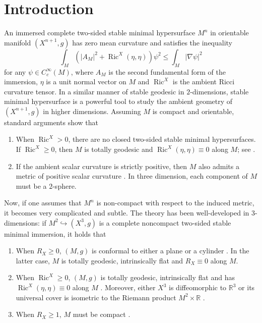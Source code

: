 \documentclass[11pt,letterpaper]{amsart}
\DeclareMathOperator{\Ric}{Ric}
\newcommand{\bR}{\mathbb{R}}
\theoremstyle{definition}
\theoremstyle{remark}
\numberwithin{equation}{section}
\begin{document}
\section{Introduction}
An immersed complete two-sided  stable minimal hypersurface $M^n$ in orientable manifold $(X^{n+1},g)$ has zero mean curvature and satisfies the inequality
\begin{equation}\label{stableinequality}
    \int_M \left(|A_M|^2+\Ric^X(\eta,\eta)\right)\psi^2\leq \int_M |\nabla \psi|^2
\end{equation}
for any $\psi\in C^{\infty}_c(M)$, where $A_M$ is the second fundamental form of the immersion, $\eta$ is a unit normal vector on $M$ and $\Ric^X$ is the ambient Ricci curvature tensor. In a similar manner of stable geodesic in $2$-dimensions, stable minimal hypersurface is a powerful tool to study the ambient geometry of $(X^{n+1},g)$ in higher dimensions. Assuming $M$ is compact and orientable, standard arguments show that
\begin{enumerate}
    \item When $\Ric^X>0$, there are no closed two-sided stable minimal hypersurfaces. If $\Ric^X\geq 0$, then $M$ is totally geodesic and $\Ric^X(\eta,\eta)\equiv 0$ along $M$; see \cite{Simons-minimal-varieties}.
    \item If the ambient scalar curvature is strictly positive, then $M$ also admits a metric of positive  scalar curvature \cite{Schoen-Yau-incompressible-minimal-surfaces, Schoen-Yau-PSC}. In three dimension, each component of $M$ must be a $2$-sphere.
\end{enumerate}

Now, if one assumes that $M^n$ is non-compact with respect to the induced metric, it becomes very complicated and subtle. The theory has been well-developed in $3$-dimensions: if $M^2\hookrightarrow (X^3,g)$ is a complete noncompact two-sided stable minimal immersion, it holds that
\begin{enumerate}
    \item When $R_X\geq 0$, $(M,g)$ is conformal to either a plane or a cylinder \cite{Fischer-Colbrie-Schoen-The-structure-of-complete-stable}. In the latter case, $M$ is totally geodesic, intrinsically flat and $R_X\equiv 0$ along $M$. 
    \item When $\Ric^X\geq 0$, $(M,g)$ is totally geodesic, intrinsically flat and has $\Ric^X(\eta,\eta)\equiv 0$ along $M$ \cite{Schoen-Yau-positive-Ricci-curvature}. Moreover, either $X^3$ is diffeomorphic to $\bR^3$ or its universal cover is isometric to the Riemann product $M^2\times \bR$ \cite{Liu-nonnegative-Ricci-curvature}.
    \item When $R_X\geq 1$, $M$ must be compact \cite{Schoen-Yau-black-hole}. 
\end{enumerate}
\end{document}
